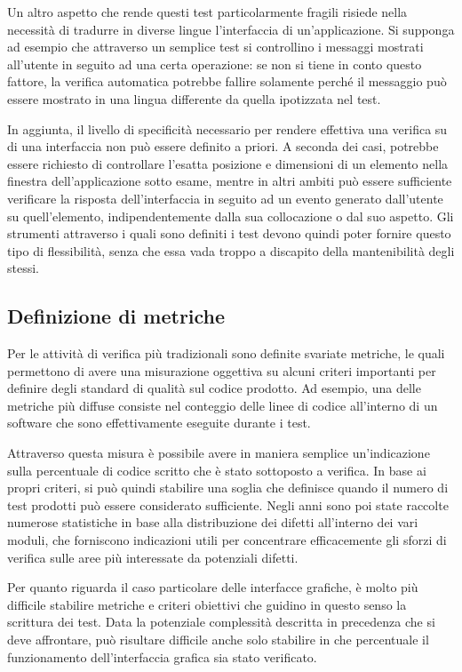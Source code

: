 \documentclass[12pt]{toptesi}
\begin{document}
Un altro aspetto che rende questi test particolarmente fragili risiede nella necessità di tradurre in diverse lingue l'interfaccia di un'applicazione. Si supponga ad esempio che attraverso un semplice test si controllino i messaggi mostrati all'utente in seguito ad una certa operazione: se non si tiene in conto questo fattore, la verifica automatica potrebbe fallire solamente perché il messaggio può essere mostrato in una lingua differente da quella ipotizzata nel test.

In aggiunta, il livello di specificità necessario per rendere effettiva una verifica su di una interfaccia non può essere definito a priori. A seconda dei casi, potrebbe essere richiesto di controllare l'esatta posizione e dimensioni di un elemento nella finestra dell'applicazione sotto esame, mentre in altri ambiti può essere sufficiente verificare la risposta dell'interfaccia in seguito ad un evento generato dall'utente su quell'elemento, indipendentemente dalla sua collocazione o dal suo aspetto.
Gli strumenti attraverso i quali sono definiti i test devono quindi poter fornire questo tipo di flessibilità, senza che essa vada troppo a discapito della mantenibilità degli stessi.

\subsection{Definizione di metriche}

Per le attività di verifica più tradizionali sono definite svariate metriche, le quali permettono di avere una misurazione oggettiva su alcuni criteri importanti per definire degli standard di qualità sul codice prodotto. Ad esempio, una delle metriche più diffuse consiste nel conteggio delle linee di codice all'interno di un software che sono effettivamente eseguite durante i test. 

Attraverso questa misura è possibile avere in maniera semplice un'indicazione sulla percentuale di codice scritto che è stato sottoposto a verifica. In base ai propri criteri, si può quindi stabilire una soglia che definisce quando il numero di test prodotti può essere considerato sufficiente. Negli anni sono poi state raccolte numerose statistiche in base alla distribuzione dei difetti all'interno dei vari moduli, che forniscono indicazioni utili per concentrare efficacemente gli sforzi di verifica sulle aree più interessate da potenziali difetti.

Per quanto riguarda il caso particolare delle interfacce grafiche, è molto più difficile stabilire metriche e criteri obiettivi che guidino in questo senso la scrittura dei test. Data la potenziale complessità descritta in precedenza che si deve affrontare, può risultare difficile anche solo stabilire in che percentuale il funzionamento dell'interfaccia grafica sia stato verificato.
\end{document}
